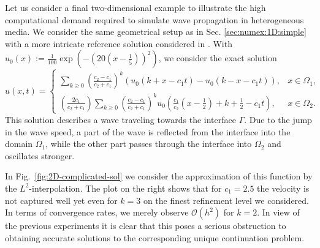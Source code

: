 \documentclass[sn-mathphys-num]{sn-jnl}
\numberwithin{equation}{section}
\begin{document}
Let us consider a final two-dimensional example to illustrate the high computational demand 
required to simulate wave propagation in heterogeneous media. 
We consider the same geometrical setup as in Sec. \ref{sec:numex:1D:simple} with a more intricate reference solution considered in \cite{BDE22,MEMM19}. With $u_0 (x) := \frac{1}{100} \exp(-(20(x-\frac{1}{5}))^2)$, we consider the exact solution 
\begin{equation}\label{eq:1D:complicatedSol}
    u(x,t) = \begin{cases}
      \sum_{k \ge 0} \left( \frac{c_2-c_1}{c_2+c_1}\right)^k \left( u_0 (k + x - c_1 t) - u_0(k-x-c_1 t)\right), &x \in \Omega_1, \\
      \left( \frac{2c_1}{c_2+c_1}\right) \sum_{k \ge 0} \left( \frac{c_2 - c_1}{c_2 + c_1}\right)^k u_0 \left( \frac{c_1}{c_2} \left( x - \frac{1}{2}\right) +k + \frac{1}{2} - c_1 t \right), & x \in \Omega_2. 
    \end{cases}
\end{equation}
This solution describes a wave traveling towards the interface $\Gamma$. Due to the jump in the wave speed, a part of the wave is reflected from the interface into the domain $\Omega_1$, while the other part passes through the interface into $\Omega_2$ and oscillates stronger. 

In Fig.~\ref{fig:2D-complicated-sol} we consider the approximation of this function by the $L^2$-interpolation. The plot on the right shows that for $c_1 = 2.5$ the velocity is not captured well yet even for $k=3$ on the finest refinement level we considered. In terms of convergence rates, we merely observe $\mathcal{O}(h^2)$ for $k=2$. In view of the previous experiments it is clear that this poses a serious obstruction to obtaining accurate solutions to the corresponding unique continuation problem.
\end{document}
